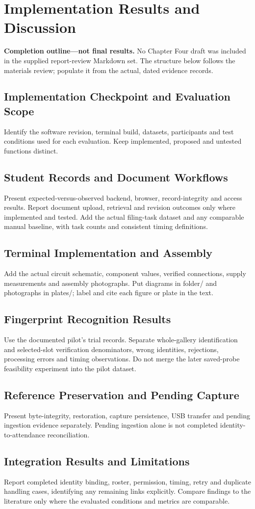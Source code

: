 \chapter{Implementation Results and Discussion}\label{chap:4}
\textbf{Completion outline---not final results.} No Chapter Four draft was
included in the supplied report-review Markdown set. The structure below follows
the materials review; populate it from the actual, dated evidence records.

\section{Implementation Checkpoint and Evaluation Scope}
Identify the software revision, terminal build, datasets, participants and test
conditions used for each evaluation. Keep implemented, proposed and untested
functions distinct.
\section{Student Records and Document Workflows}
Present expected-versus-observed backend, browser, record-integrity and access
results. Report document upload, retrieval and revision outcomes only where
implemented and tested. Add the actual filing-task dataset and any comparable
manual baseline, with task counts and consistent timing definitions.
\section{Terminal Implementation and Assembly}
Add the actual circuit schematic, component values, verified connections,
supply measurements and assembly photographs. Put diagrams in folder/ and
photographs in plates/; label and cite each figure or plate in the text.
\section{Fingerprint Recognition Results}
Use the documented pilot's trial records. Separate whole-gallery identification
and selected-slot verification denominators, wrong identities, rejections,
processing errors and timing observations. Do not merge the later saved-probe
feasibility experiment into the pilot dataset.
\section{Reference Preservation and Pending Capture}
Present byte-integrity, restoration, capture persistence, USB transfer and pending
ingestion evidence separately. Pending ingestion alone is not completed
identity-to-attendance reconciliation.
\section{Integration Results and Limitations}
Report completed identity binding, roster, permission, timing, retry and duplicate
handling cases, identifying any remaining links explicitly. Compare findings to
the literature only where the evaluated conditions and metrics are comparable.
